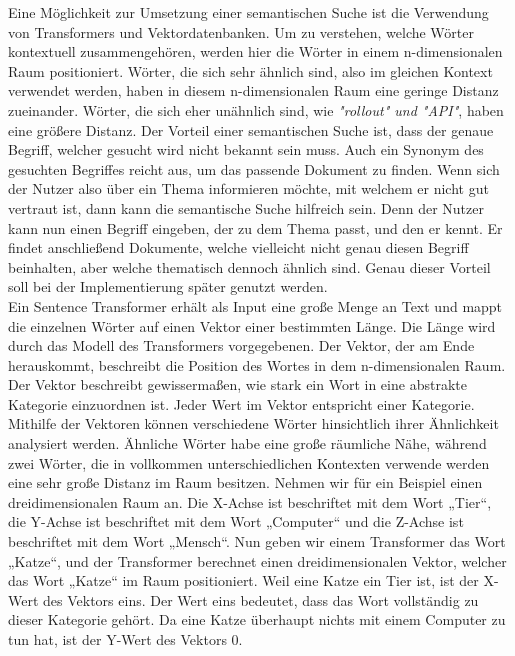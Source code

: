 Eine Möglichkeit zur Umsetzung einer semantischen Suche ist die Verwendung von Transformers und Vektordatenbanken.
Um zu verstehen, welche Wörter kontextuell zusammengehören, werden hier die Wörter in einem n-dimensionalen Raum positioniert.
Wörter, die sich sehr ähnlich sind, also im gleichen Kontext verwendet werden, haben in diesem n-dimensionalen Raum eine geringe Distanz zueinander.
Wörter, die sich eher unähnlich sind, wie \textit{"rollout" und "API"}, haben eine größere Distanz.
Der Vorteil einer semantischen Suche ist, dass der genaue Begriff, welcher gesucht wird nicht bekannt sein muss.
Auch ein Synonym des gesuchten Begriffes reicht aus, um das passende Dokument zu finden.
Wenn sich der Nutzer also über ein Thema informieren möchte, mit welchem er nicht gut vertraut ist, dann kann die semantische Suche hilfreich sein.
Denn der Nutzer kann nun einen Begriff eingeben, der zu dem Thema passt, und den er kennt.
Er findet anschließend Dokumente, welche vielleicht nicht genau diesen Begriff beinhalten, aber welche thematisch dennoch ähnlich sind.
Genau dieser Vorteil soll bei der Implementierung später genutzt werden.\\

Ein Sentence Transformer erhält als Input eine große Menge an Text und mappt die einzelnen Wörter auf einen Vektor einer bestimmten Länge.
Die Länge wird durch das Modell des Transformers vorgegebenen.
Der Vektor, der am Ende herauskommt, beschreibt die Position des Wortes in dem n-dimensionalen Raum.
Der Vektor beschreibt gewissermaßen, wie stark ein Wort in eine abstrakte Kategorie einzuordnen ist.
Jeder Wert im Vektor entspricht einer Kategorie.
Mithilfe der Vektoren können verschiedene Wörter hinsichtlich ihrer Ähnlichkeit analysiert werden.
Ähnliche Wörter habe eine große räumliche Nähe, während zwei Wörter, die in vollkommen unterschiedlichen Kontexten verwende werden eine sehr große Distanz im Raum besitzen.
Nehmen wir für ein Beispiel einen dreidimensionalen Raum an.
Die X-Achse ist beschriftet mit dem Wort „Tier“, die Y-Achse ist beschriftet mit dem Wort „Computer“ und die Z-Achse ist beschriftet mit dem Wort „Mensch“.
Nun geben wir einem Transformer das Wort „Katze“, und der Transformer berechnet einen dreidimensionalen Vektor, welcher das Wort „Katze“ im Raum positioniert.
Weil eine Katze ein Tier ist, ist der X-Wert des Vektors eins.
Der Wert eins bedeutet, dass das Wort vollständig zu dieser Kategorie gehört.
Da eine Katze überhaupt nichts mit einem Computer zu tun hat, ist der Y-Wert des Vektors 0.\\

